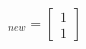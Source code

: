\documentclass[preview]{standalone}
\begin{document}
\begin{align*}
[\vec{v}]_{new} = \begin{bmatrix} 1 \\ 1 \end{bmatrix}
\end{align*}
\end{document}
